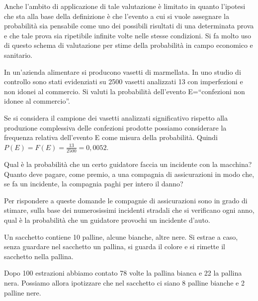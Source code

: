 Anche l'ambito di applicazione di tale valutazione è limitato in quanto 
l'ipotesi che sta alla base della definizione è che l'evento a cui si vuole 
assegnare la probabilità sia pensabile come uno dei possibili risultati di 
una 
determinata prova e che tale prova sia ripetibile infinite volte nelle stesse 
condizioni.
Si fa molto uso di questo schema di valutazione per stime della probabilità 
in 
campo economico e sanitario.

\begin{esempio}
In un'azienda alimentare si producono vasetti di marmellata. In uno studio di 
controllo sono stati evidenziati su 2500 vasetti analizzati 13 con 
imperfezioni 
e non idonei al commercio. Si valuti la probabilità dell'evento 
E=``confezioni 
non idonee al commercio''.

Se si considera il campione dei vasetti analizzati significativo rispetto 
alla 
produzione complessiva delle confezioni prodotte possiamo considerare la 
frequenza relativa dell'evento E come misura della probabilità. Quindi 
\(P(E)=F(E)=\frac{13}{2500}=0,0052\).
\end{esempio}

\begin{esempio}
Qual è la probabilità che un certo guidatore faccia un incidente con la 
macchina? Quanto deve pagare, come premio, a una compagnia di assicurazioni 
in 
modo che, se fa un incidente, la compagnia paghi per intero il danno?

Per rispondere a queste domande le compagnie di assicurazioni sono in grado 
di 
stimare, sulla base dei numerosissimi incidenti stradali che si verificano 
ogni 
anno, qual è la probabilità che un guidatore provochi un incidente d'auto.
\end{esempio}

\begin{esempio}
Un sacchetto contiene 10 palline, alcune bianche, altre nere. Si estrae a 
caso, 
senza guardare nel sacchetto un pallina, si guarda il colore e si rimette il 
sacchetto nella pallina.

Dopo 100 estrazioni abbiamo contato 78 volte la pallina bianca e 22 la 
pallina 
nera. Possiamo allora ipotizzare che nel sacchetto ci siano 8 palline bianche 
e 
2 palline nere.
\end{esempio}


